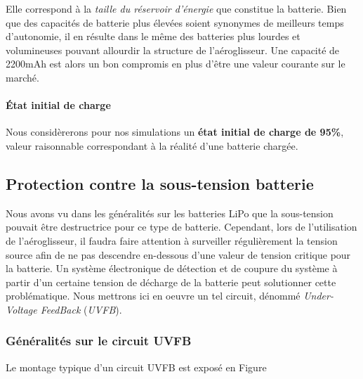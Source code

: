 				Elle correspond à la \textit{taille du réservoir d'énergie} que 
				constitue la batterie. Bien que des capacités de batterie plus
				élevées soient synonymes de meilleurs temps d'autonomie, il en
				résulte dans le même des batteries plus lourdes et volumineuses
				pouvant allourdir la structure de l'aéroglisseur.
				Une capacité de 2200mAh est alors un bon compromis en plus d'être
				une valeur courante sur le marché.
				
				\vspace{-0.5em}
			
				\paragraph{État initial de charge}
			
				Nous considèrerons pour nos simulations un 
				\textbf{état initial de charge de 95\%}, 
				valeur raisonnable correspondant à la réalité d'une 
				batterie chargée.
			
			
			
		\subsection{Protection contre la sous-tension batterie}
			
		Nous avons vu dans les généralités sur les batteries LiPo que la 
		sous-tension pouvait être destructrice pour ce type de batterie. 
		Cependant, lors de l'utilisation de l'aéroglisseur, il faudra faire
		attention à surveiller régulièrement la tension source afin de ne 
		pas descendre en-dessous d'une valeur de tension critique pour la 
		batterie. 
		Un système électronique de détection et de coupure du système à 
		partir d'un certaine tension de décharge de la batterie peut 
		solutionner cette problématique. Nous mettrons ici en oeuvre un tel 
		circuit, dénommé \textit{Under-Voltage FeedBack} (\textit{UVFB}).
			
			\subsubsection{Généralités sur le circuit UVFB}
				
			Le montage typique d'un circuit UVFB est exposé en Figure 
				
